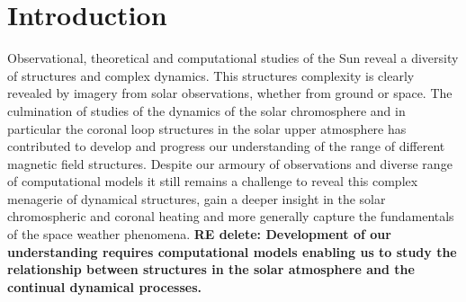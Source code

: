\documentclass{aastex62}
\begin{document}


\section{Introduction} \label{sec:intro}

Observational, theoretical and computational studies of the Sun reveal a diversity of  structures and complex dynamics. This structures complexity is clearly revealed by imagery from solar observations, whether from ground or space. The culmination of studies of the dynamics of the solar chromosphere and in particular the coronal loop structures in the solar upper atmosphere has contributed to develop and progress our understanding of the range of different magnetic field structures. %
Despite our armoury of observations and diverse range of computational models it still remains a challenge to reveal this complex menagerie of dynamical structures, gain a deeper insight in the solar chromospheric and coronal heating and more generally capture the fundamentals of the space weather phenomena. {\bf RE delete: Development of our understanding requires computational models enabling us to study the relationship between structures in the solar atmosphere and the continual dynamical processes.}
\end{document}
